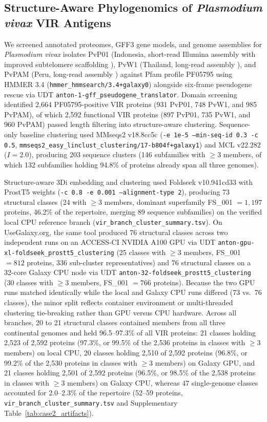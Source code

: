 \documentclass[11pt,letterpaper]{article}
\newcommand{\tool}[1]{\textsf{#1}}
\begin{document}
\subsection*{Structure-Aware Phylogenomics of \textit{Plasmodium vivax} VIR Antigens}
We screened annotated proteomes, GFF3 gene models, and genome assemblies for \textit{Plasmodium vivax} isolates PvP01 (Indonesia, short-read Illumina assembly with improved subtelomere scaffolding \cite{auburn2016}), PvW1 (Thailand, long-read assembly \cite{minassian2021pvw1}), and PvPAM (Peru, long-read assembly \cite{demeulenaere2023}) against Pfam profile PF05795 using \tool{HMMER} 3.4 (\nolinkurl{hmmer_hmmsearch/3.4+galaxy0}) alongside six-frame pseudogene rescue via UDT \nolinkurl{anton-1-gff_pseudogene_translator}. Domain screening identified 2,664 PF05795-positive VIR proteins (931 PvP01, 748 PvW1, and 985 PvPAM), of which 2,592 functional VIR proteins (897 PvP01, 735 PvW1, and 960 PvPAM) passed length filtering into structure-aware clustering. Sequence-only baseline clustering used \tool{MMseqs2} v18.8cc5c (\texttt{-e 1e-5 --min-seq-id 0.3 -c 0.5}, \nolinkurl{mmseqs2_easy_linclust_clustering/17-b804f+galaxy1}) and \tool{MCL} v22.282 ($I = 2.0$), producing 203 sequence clusters (146 subfamilies with $\ge 3$ members, of which 132 subfamilies holding 94.8\% of proteins already span all three genomes).

Structure-aware 3Di embedding and clustering used \tool{Foldseek} v10.941cd33 with \tool{ProstT5} weights (\texttt{-c 0.8 -e 0.001 --alignment-type 2}), producing 73 structural classes (24 with $\ge 3$ members, dominant superfamily FS\_001 $= 1{,}197$ proteins, 46.2\% of the repertoire, merging 89 sequence subfamilies) on the verified local CPU reference branch (\nolinkurl{vir_branch_cluster_summary.tsv}). On UseGalaxy.org, the same tool produced 76 structural classes across two independent runs on an ACCESS-CI NVIDIA A100 GPU via UDT \nolinkurl{anton-gpu-xl-foldseek_prostt5_clustering} (25 classes with $\ge 3$ members, FS\_001 $= 812$ proteins, 336 sub-cluster representatives) and 76 structural classes on a 32-core Galaxy CPU node via UDT \nolinkurl{anton-32-foldseek_prostt5_clustering} (30 classes with $\ge 3$ members, FS\_001 $= 766$ proteins). Because the two GPU runs matched identically while the local and Galaxy CPU runs differed (73 vs.\ 76 classes), the minor split reflects container environment or multi-threaded clustering tie-breaking rather than GPU versus CPU hardware. Across all branches, 20 to 21 structural classes contained members from all three continental genomes and held 96.5--97.3\% of all VIR proteins: 21 classes holding 2,523 of 2,592 proteins (97.3\%, or 99.5\% of the 2,536 proteins in classes with $\ge 3$ members) on local CPU, 20 classes holding 2,510 of 2,592 proteins (96.8\%, or 99.2\% of the 2,530 proteins in classes with $\ge 3$ members) on Galaxy GPU, and 21 classes holding 2,501 of 2,592 proteins (96.5\%, or 98.5\% of the 2,538 proteins in classes with $\ge 3$ members) on Galaxy CPU, whereas 47 single-genome classes accounted for 2.0--2.3\% of the repertoire (52--59 proteins, \nolinkurl{vir_branch_cluster_summary.tsv} and Supplementary Table~\ref{tab:case2_artifacts}).
\end{document}
